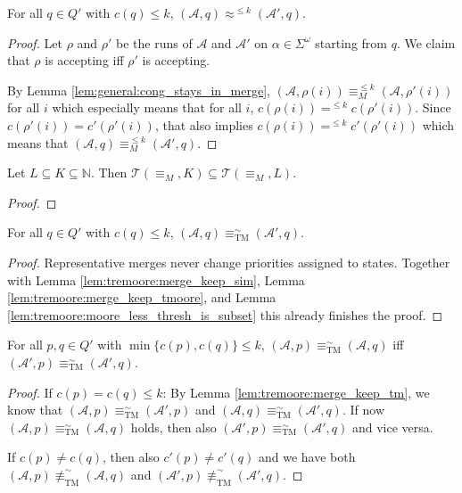 \begin{lem}
	For all $q \in Q'$ with $c(q) \leq k$, $(\mathcal{A}, q) \approx^{\leq k} (\mathcal{A}', q)$.
	\label{lem:tremoore:merge_keep_tmoore}
\end{lem}

\begin{proof} 
	Let $\rho$ and $\rho'$ be the runs of $\mathcal{A}$ and $\mathcal{A}'$ on $\alpha \in \Sigma^\omega$ starting from $q$. We claim that $\rho$ is accepting iff $\rho'$ is accepting.
	
	By Lemma \ref{lem:general:cong_stays_in_merge}, $(\mathcal{A}, \rho(i)) \equiv_M^{\leq k} (\mathcal{A}, \rho'(i))$ for all $i$ which especially means that for all $i$, $c(\rho(i)) =^{\leq k} c(\rho'(i))$. Since $c(\rho'(i)) = c'(\rho'(i))$, that also implies $c(\rho(i)) =^{\leq k} c'(\rho'(i))$ which means that $(\mathcal{A}, q) \equiv_M^{\leq k} (\mathcal{A}', q)$.
\end{proof}

\begin{lem}
	Let $L \subseteq K \subseteq \mathbb{N}$. Then $\mathcal{T}(\equiv_M, K) \subseteq \mathcal{T}(\equiv_M, L)$.
	\label{lem:tremoore:moore_less_thresh_is_subset}
\end{lem}

\begin{proof}
\end{proof}

\begin{lem}
	For all $q \in Q'$ with $c(q) \leq k$, $(\mathcal{A}, q) \equiv^\sim_\text{TM} (\mathcal{A}', q)$.
	\label{lem:tremoore:merge_keep_tm}
\end{lem}

\begin{proof}
	Representative merges never change priorities assigned to states. Together with Lemma \ref{lem:tremoore:merge_keep_sim}, Lemma \ref{lem:tremoore:merge_keep_tmoore}, and Lemma \ref{lem:tremoore:moore_less_thresh_is_subset} this already finishes the proof.
\end{proof}

\begin{lem}
	For all $p, q \in Q'$ with $\min \{c(p), c(q)\} \leq k$, $(\mathcal{A}, p) \equiv^\sim_\text{TM} (\mathcal{A}, q)$ iff \linebreak $(\mathcal{A}', p) \equiv^\sim_\text{TM} (\mathcal{A}', q)$.
	\label{lem:tremoore:merge_changes_only_higher}
\end{lem}

\begin{proof}
	If $c(p) = c(q) \leq k$: By Lemma \ref{lem:tremoore:merge_keep_tm}, we know that $(\mathcal{A}, p) \equiv^\sim_\text{TM} (\mathcal{A}', p)$ and $(\mathcal{A}, q) \equiv^\sim_\text{TM} (\mathcal{A}', q)$. If now $(\mathcal{A}, p) \equiv^\sim_\text{TM} (\mathcal{A}, q)$ holds, then also $(\mathcal{A}', p) \equiv^\sim_\text{TM} (\mathcal{A}', q)$ and vice versa.
	
	If $c(p) \neq c(q)$, then also $c'(p) \neq c'(q)$ and we have both $(\mathcal{A}, p) \not\equiv^\sim_\text{TM} (\mathcal{A}, q)$ and $(\mathcal{A}', p) \not\equiv^\sim_\text{TM} (\mathcal{A}', q)$.
\end{proof}

